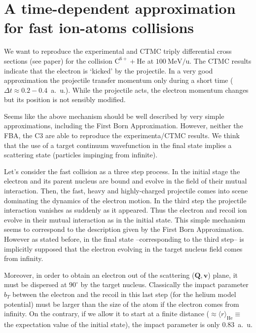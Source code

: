 \chapter{A time-dependent approximation for fast ion-atoms collisions}


We want to reproduce the experimental and CTMC triply differential
cross sections (see paper) for the collision $\mathrm{C}^{6+} +
\mathrm{He}$ at $100~\mathrm{MeV/u}$. The CTMC results indicate that
the electron is `kicked' by the projectile. In a very good
approximation the projectile transfer momentum only during a short time
($\Delta t \approx 0.2-0.4${~a.~u.}).  While the projectile acts,
the electron momentum changes but its position is not sensibly
modified.

Seems like the above mechanism should be well described by very simple
approximations, including the First Born Approximation. However,
neither the FBA, the C3 are able to reproduce the experimenta/CTMC
results.
%
We think that the use of a target continuum wavefunction in the final
state implies a scattering state (particles impinging from infinite).

Let's consider the fast collision as a three step process. In the
initial stage the electron and its parent nucleus are bound and evolve
in the field of their mutual interaction. Then, the fast, heavy and
highly-charged projectile comes into scene dominating the dynamics of
the electron motion. In the third step the projectile interaction
vanishes as suddenly as it appeared. Thus the electron and recoil ion
evolve in their mutual interaction as in the initial state.
%
This simple mechanism seems to correspond to the description given by
the First Born Approximation. However as stated before, in the final
state --corresponding to the third step-- is implicitly supposed that
the electron evolving in the target nucleus field comes from infinity.

Moreover, in order to obtain an electron out of the scattering
($\bm{Q},\bm{v}$) plane, it must be dispersed at $90^{\circ}$ by the
target nucleus. Classically the impact parameter $b_{T}$ between the
electron and the recoil in this last step (for the helium model
potential) must be larger than the size of the atom if the electron
comes from infinity. On the contrary, if we allow it to start at a
finite distance ($\approx \langle r \rangle_{\mathrm{He}}\equiv$ the
expectation value of the initial state), the impact parameter is only
0.83~{a.~u.}

\medskip

